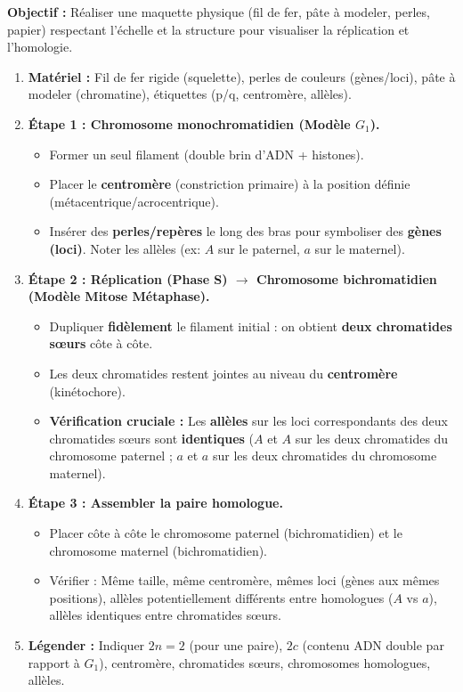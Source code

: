 \documentclass[11pt]{article}
\begin{document}
\begin{methode}
\textbf{Objectif :} Réaliser une maquette physique (fil de fer, pâte à modeler, perles, papier) respectant l'échelle et la structure pour visualiser la réplication et l'homologie.
\begin{enumerate}
    \item \textbf{Matériel :} Fil de fer rigide (squelette), perles de couleurs (gènes/loci), pâte à modeler (chromatine), étiquettes (p/q, centromère, allèles).
    \item \textbf{Étape 1 : Chromosome monochromatidien (Modèle $G_1$).}
        \begin{itemize}
            \item Former un seul filament (double brin d'ADN + histones).
            \item Placer le \textbf{centromère} (constriction primaire) à la position définie (métacentrique/acrocentrique).
            \item Insérer des \textbf{perles/repères} le long des bras pour symboliser des \textbf{gènes (loci)}. Noter les allèles (ex: $A$ sur le paternel, $a$ sur le maternel).
        \end{itemize}
    \item \textbf{Étape 2 : Réplication (Phase S) $\rightarrow$ Chromosome bichromatidien (Modèle Mitose Métaphase).}
        \begin{itemize}
            \item Dupliquer \textbf{fidèlement} le filament initial : on obtient \textbf{deux chromatides sœurs} côte à côte.
            \item Les deux chromatides restent jointes au niveau du \textbf{centromère} (kinétochore).
            \item \textbf{Vérification cruciale :} Les \textbf{allèles} sur les loci correspondants des deux chromatides sœurs sont \textbf{identiques} ($A$ et $A$ sur les deux chromatides du chromosome paternel ; $a$ et $a$ sur les deux chromatides du chromosome maternel).
        \end{itemize}
    \item \textbf{Étape 3 : Assembler la paire homologue.}
        \begin{itemize}
            \item Placer côte à côte le chromosome paternel (bichromatidien) et le chromosome maternel (bichromatidien).
            \item Vérifier : Même taille, même centromère, mêmes loci (gènes aux mêmes positions), allèles potentiellement différents entre homologues ($A$ vs $a$), allèles identiques entre chromatides sœurs.
        \end{itemize}
    \item \textbf{Légender :} Indiquer $2n=2$ (pour une paire), $2c$ (contenu ADN double par rapport à $G_1$), centromère, chromatides sœurs, chromosomes homologues, allèles.
\end{enumerate}
\end{methode}
\end{document}
